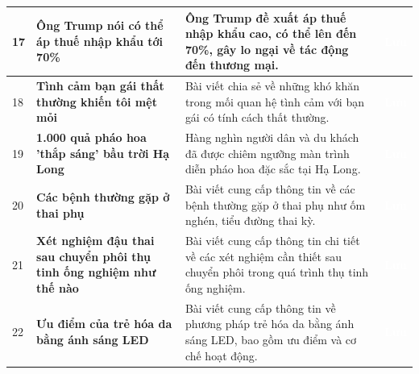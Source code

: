 \documentclass[12pt,a4paper]{article}
\begin{document}
\begin{longtable}{|p{}|L{0.45\textwidth}|L{0.42\textwidth}|p{0.06\textwidth}|}
17 & \textbf{Ông Trump nói có thể áp thuế nhập khẩu tới 70\%}  & Ông Trump đề xuất áp thuế nhập khẩu cao, có thể lên đến 70\%, gây lo ngại về tác động đến thương mại. & \textcolor{white}{\textbf{Lưu}} \\
\hline

18 & \textbf{Tình cảm bạn gái thất thường khiến tôi mệt mỏi}  & Bài viết chia sẻ về những khó khăn trong mối quan hệ tình cảm với bạn gái có tính cách thất thường. & \textcolor{white}{\textbf{Lưu}} \\
\hline

19 & \textbf{1.000 quả pháo hoa 'thắp sáng' bầu trời Hạ Long}  & Hàng nghìn người dân và du khách đã được chiêm ngưỡng màn trình diễn pháo hoa đặc sắc tại Hạ Long. & \textcolor{white}{\textbf{Lưu}} \\
\hline

20 & \textbf{Các bệnh thường gặp ở thai phụ}  & Bài viết cung cấp thông tin về các bệnh thường gặp ở thai phụ như ốm nghén, tiểu đường thai kỳ. & \textcolor{white}{\textbf{Lưu}} \\
\hline

21 & \textbf{Xét nghiệm đậu thai sau chuyển phôi thụ tinh ống nghiệm như thế nào}  & Bài viết cung cấp thông tin chi tiết về các xét nghiệm cần thiết sau chuyển phôi trong quá trình thụ tinh ống nghiệm. & \textcolor{white}{\textbf{Lưu}} \\
\hline

22 & \textbf{Ưu điểm của trẻ hóa da bằng ánh sáng LED}  & Bài viết cung cấp thông tin về phương pháp trẻ hóa da bằng ánh sáng LED, bao gồm ưu điểm và cơ chế hoạt động. & \textcolor{white}{\textbf{Lưu}} \\
\hline


\end{longtable}
\end{document}
